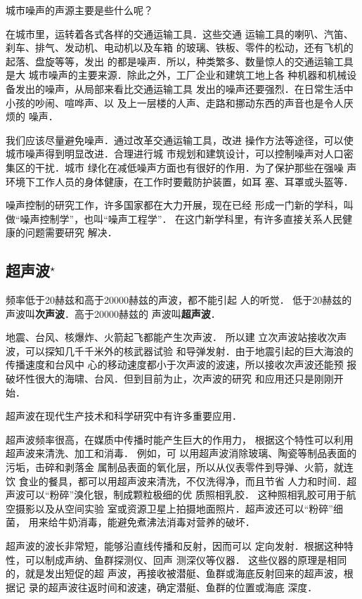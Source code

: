 城市噪声的声源主要是些什么呢？

在城市里，运转着各式各样的交通运输工具．这些交通
运输工具的喇叭、汽笛、刹车、排气、发动机、电动机以及车箱
的玻璃、铁板、零件的松动，还有飞机的起落、盘旋等等，发出
的都是噪声．所以，种类繁多、数量惊人的交通运输工具是大
城市噪声的主要来源．除此之外，工厂企业和建筑工地上各
种机器和机械设备发出的噪声，从局部来看比交通运输工具
发出的噪声还要强烈．在日常生活中小孩的吵闹、喧哗声、以
及上一层楼的人声、走路和挪动东西的声音也是令人厌烦的
噪声．

我们应该尽量避免噪声．通过改革交通运输工具，改进
操作方法等途径，可以使城市噪声得到明显改进．合理进行城
市规划和建筑设计，可以控制噪声对人口密集区的干扰．城市
绿化在减低噪声方面也有很好的作用．为了保护那些在强噪
声环境下工作人员的身体健康，在工作时要戴防护装置，如耳
塞、耳罩或头盔等．

噪声控制的研究工作，许多国家都在大力开展，现在已经
形成一门新的学科，叫做“噪声控制学”，也叫“噪声工程学”．
在这门新学科里，有许多直接关系人民健康的问题需要研究
解决．

\subsection{超声波$^\star$}
频率低于20赫兹和高于20000赫兹的声波，都不能引起
人的听觉．
低于20赫兹的声波叫\textbf{次声波}．高于20000赫兹的
声波叫\textbf{超声波}．

地震、台风、核爆炸、火箭起飞都能产生次声波．
所以建
立次声波站接收次声波，可以探知几千千米外的核武器试验
和导弹发射．由于地震引起的巨大海浪的传播速度和台风中
心的移动速度都小于次声波的波速，所以接收次声波还能预
报破坏性很大的海啸、台风．但到目前为止，次声波的研究
和应用还只是刚刚开始．

超声波在现代生产技术和科学研究中有许多重要应用．

超声波频率很高，在媒质中传播时能产生巨大的作用力，
根据这个特性可以利用超声波来清洗、加工和消毒．
例如，可
以用超声波消除玻璃、陶瓷等制品表面的污垢，击碎和剥落金
属制品表面的氧化层，所以从仪表零件到导弹、火箭，就连饮
食业的餐具，都可以用超声波来清洗，不仅洗得净，而且节省
人力和时间．超声波可以“粉碎”溴化银，制成颗粒极细的优
质照相乳胶．
这种照相乳胶可用于航空摄影以及从空间实验
室或资源卫星上拍摄地面照片．超声波还可以“粉碎”细菌，
用来给牛奶消毒，能避免煮沸法消毒对营养的破坏．

超声波的波长非常短，能够沿直线传播和反射，因而可以
定向发射．根据这种特性，可以制成声纳、鱼群探测仪、回声
测深仪等仪器．
这些仪器的原理是相同的，就是发出短促的超
声波，再接收被潜艇、鱼群或海底反射回来的超声波，根据记
录的超声波往返时间和波速，确定潜艇、鱼群的位置或海底
深度．

